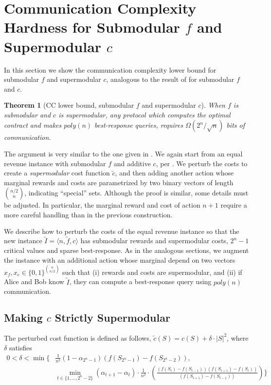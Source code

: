 \documentclass[11pt]{article}
\newtheorem{theorem}{Theorem}
\newcommand{\inst}[3]{\langle #1, #2, #3 \rangle}
\newcommand{\tc}{\tilde{c}}
\newcommand{\tf}{\tilde{f}}
\newcommand{\tI}{\tilde{I}}
\newcommand{\InstFTildeI}{\tI = \inst{n}{\tf}{c}}
\begin{document}
\section{Communication Complexity Hardness for Submodular $f$ and Supermodular $c$}\label{sec:cc_lower_bound_submod_f_supmod_c}
In this section we show the communication complexity lower bound for submodular $f$ and supermodular $c$, analogous to the result of  for submodular $f$ and $c$.

\begin{theorem}[CC lower bound, submodular $f$ and supermodular $c$]\label{thm:cc_submod_f_supmod_c}
    When $f$ is submodular and $c$ is supermodular, any protocol which computes the optimal contract and makes $poly(n)$ best-response queries, requires $\Omega(2^n/\sqrt{n})$ bits of communication.
\end{theorem}

The argument is very similar to the one given in . We again start from an equal revenue instance with submodular $f$ and additive $c$, per .
We perturb the costs to create a \emph{supermodular} cost function $\tc$, and then adding another action whose marginal rewards and costs are parametrized by two binary vectors of length $\binom{n/2}{n}$, indicating ``special'' sets. 
Although the proof is similar, some details must be adjusted. In particular, the marginal reward and cost of action $n+1$ require a more careful handling than in the previous construction.

We describe how to perturb the costs of the equal revenue instance so that the new instance $\InstFTildeI$ has submodular rewards and supermodular costs, $2^n-1$ critical values and sparse best-response.
As in the analogous sections, we augment the instance with an additional action whose marginal depend on two vectors $x_f,x_c \in \{0,1\}^{\binom{n}{n/2}}$ such that (i) rewards and costs are supermodular, and (ii) if Alice and Bob know $\tI$, they can compute a best-response query using $poly(n)$ communication.

\subsection{Making $c$ Strictly Supermodular}
The perturbed cost function is defined as follows, $\tc(S)=c(S) + \delta \cdot |S|^2$, where $\delta$ satisfies
\begin{align}\label{eq:eps_for_tc_supermod}
0 < 
\delta < \min \Bigg\{ 
& 
\frac{1}{n^2}(1-\alpha_{2^n-1})(f(S_{2^n-1})-f(S_{2^n-2})), \\
& \min_{t \in \{1,\dots,2^n-2\}} (\alpha_{t+1}-\alpha_t)\cdot \frac{1}{n^2} \cdot \left(\frac{(f(S_t)-f(S_{t-1}))(f(S_{t+1})-f(S_t))}{(f(S_{t+1})-f(S_{t-1}))}\right) \nonumber \bigg\}
\end{align}
\end{document}
